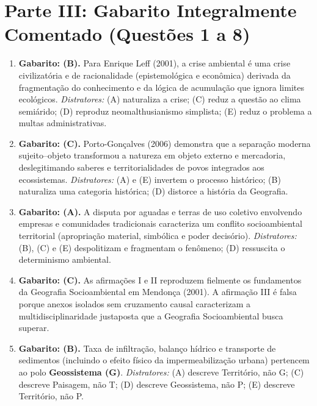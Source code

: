 \clearpage
\section*{Parte III: Gabarito Integralmente Comentado (Questões 1 a 8)}

\begin{boxGabarito}
\begin{enumerate}[leftmargin=1.8em, itemsep=4pt]
  \item \textbf{Gabarito: (B).} Para Enrique Leff (2001), a crise ambiental é uma crise civilizatória e de racionalidade (epistemológica e econômica) derivada da fragmentação do conhecimento e da lógica de acumulação que ignora limites ecológicos. \textit{Distratores:} (A) naturaliza a crise; (C) reduz a questão ao clima semiárido; (D) reproduz neomalthusianismo simplista; (E) reduz o problema a multas administrativas.
  \item \textbf{Gabarito: (C).} Porto-Gonçalves (2006) demonstra que a separação moderna sujeito--objeto transformou a natureza em objeto externo e mercadoria, deslegitimando saberes e territorialidades de povos integrados aos ecossistemas. \textit{Distratores:} (A) e (E) invertem o processo histórico; (B) naturaliza uma categoria histórica; (D) distorce a história da Geografia.
  \item \textbf{Gabarito: (A).} A disputa por aguadas e terras de uso coletivo envolvendo empresas e comunidades tradicionais caracteriza um conflito socioambiental territorial (apropriação material, simbólica e poder decisório). \textit{Distratores:} (B), (C) e (E) despolitizam e fragmentam o fenômeno; (D) ressuscita o determinismo ambiental.
  \item \textbf{Gabarito: (C).} As afirmações I e II reproduzem fielmente os fundamentos da Geografia Socioambiental em Mendonça (2001). A afirmação III é falsa porque anexos isolados sem cruzamento causal caracterizam a multidisciplinaridade justaposta que a Geografia Socioambiental busca superar.
  \item \textbf{Gabarito: (B).} Taxa de infiltração, balanço hídrico e transporte de sedimentos (incluindo o efeito físico da impermeabilização urbana) pertencem ao polo \textbf{Geossistema (G)}. \textit{Distratores:} (A) descreve Território, não G; (C) descreve Paisagem, não T; (D) descreve Geossistema, não P; (E) descreve Território, não P.

\end{enumerate}
\end{boxGabarito}
